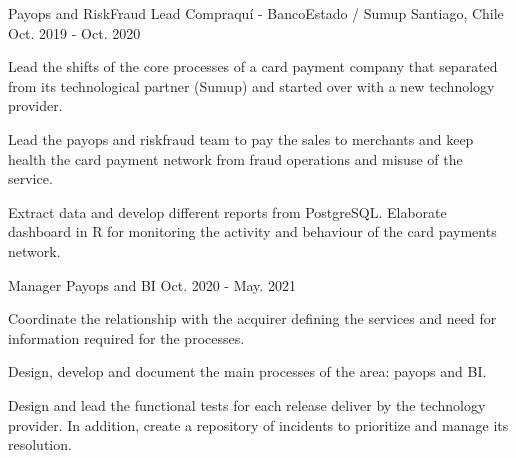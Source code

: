

\begin{cventries}

  \cventrytwopositions
    {Payops and RiskFraud Lead}
    {Compraquí - BancoEstado / Sumup}
    {Santiago, Chile}
    {Oct. 2019 - Oct. 2020}
    {
      \begin{cvitems}
              \item {Lead the shifts of the core processes of a card payment company that separated from its technological partner (Sumup) and started over with a new technology provider.}
              \item {Lead the payops and riskfraud team to pay the sales to merchants and keep health the card payment network from fraud operations and misuse of the service.}
              \item {Extract data and develop different reports from PostgreSQL. Elaborate dashboard in R for monitoring the activity and behaviour of the card payments network.}
      \end{cvitems}
    }
    {Manager Payops and BI}
    {Oct. 2020 - May. 2021}
    {
      \begin{cvitems}
        \item {Coordinate the relationship with the acquirer defining the services and need for information required for the processes.}
        \item {Design, develop and document the main processes of the area: payops and BI.}
        \item {Design and lead the functional tests for each release deliver by the technology provider. In addition, create a repository of incidents to prioritize and manage its resolution.}        
      \end{cvitems}
    }
    

\end{cventries}
